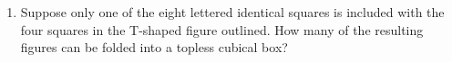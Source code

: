 \documentclass{article}
\theoremstyle{definition}
\newtheorem*{solution}{Solution}
\begin{document}
\begin{multicols*}{2}
\begin{enumerate}
\begin{solution}
            \end{solution}
        \item Suppose only one of the eight lettered identical squares is included with the four squares in the T-shaped figure outlined.
            How many of the resulting figures can be folded into a topless cubical box?
            \begin{center}
\end{center}
\end{enumerate}
\end{multicols*}
\end{document}

